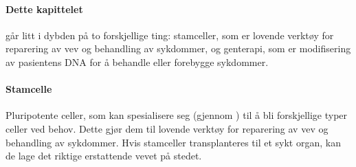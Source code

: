 \bigskip\bigskip\bigskip %

\paragraph{Dette kapittelet} går litt i dybden på to forskjellige ting: stamceller, som er lovende verktøy for reparering av vev og behandling av sykdommer, og genterapi, som er modifisering av pasientens DNA for å behandle eller forebygge sykdommer.


\paragraph{Stamcelle} Pluripotente celler, som kan spesialisere seg (gjennom ) til å bli forskjellige typer celler ved behov. Dette gjør dem til lovende verktøy for reparering av vev og behandling av sykdommer. Hvis stamceller transplanteres til et sykt organ, kan de lage det riktige erstattende vevet på stedet.

